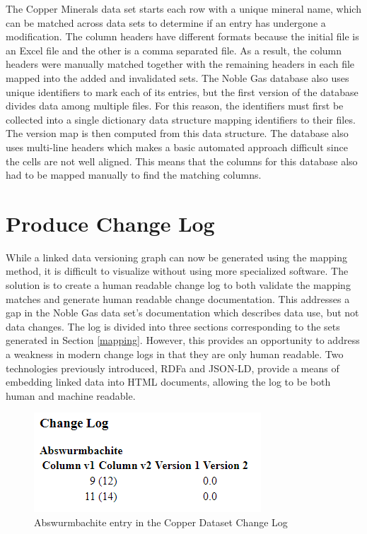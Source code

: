 The Copper Minerals data set starts each row with a unique mineral name, which can be matched across data sets to determine if an entry has undergone a modification.
The column headers have different formats because the initial file is an Excel file and the other is a comma separated file.
As a result, the column headers were manually matched together with the remaining headers in each file mapped into the added and invalidated sets.
The Noble Gas database also uses unique identifiers to mark each of its entries, but the first version of the database divides data among multiple files.
For this reason, the identifiers must first be collected into a single dictionary data structure mapping identifiers to their files.
The version map is then computed from this data structure.
The database also uses multi-line headers which makes a basic automated approach difficult since the cells are not well aligned.
This means that the columns for this database also had to be mapped manually to find the matching columns.

\section{Produce Change Log}

While a linked data versioning graph can now be generated using the mapping method, it is difficult to visualize without using more specialized software.
The solution is to create a human readable change log to both validate the mapping matches and generate human readable change documentation.
This addresses a gap in the Noble Gas data set's documentation which describes data use, but not data changes.
The log is divided into three sections corresponding to the sets generated in Section \ref{mapping}.
However, this provides an opportunity to address a weakness in modern change logs in that they are only human readable.
Two technologies previously introduced, RDFa and JSON-LD, provide a means of embedding linked data into HTML documents, allowing the log to be both human and machine readable.

\begin{figure}
	\centering
	\includegraphics[scale=0.80]{figures/Changelog-zoomed.png}
	\caption{Abswurmbachite entry in the Copper Dataset Change Log}
	\label{changelog_zoomed}
\end{figure}

